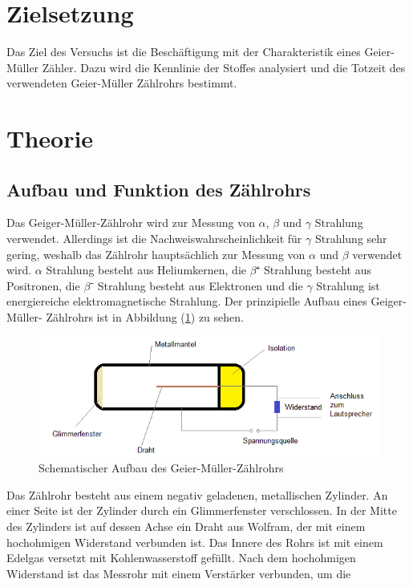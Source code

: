 \section{Zielsetzung}
\label{sec:Zielsetzung}
Das Ziel des Versuchs ist die Beschäftigung mit der Charakteristik eines Geier-Müller 
Zähler. Dazu wird die Kennlinie der Stoffes  analysiert und 
die Totzeit des verwendeten Geier-Müller Zählrohrs bestimmt.
\section{Theorie}
\label{sec:Theorie}
\subsection{Aufbau und Funktion des Zählrohrs}
Das Geiger-Müller-Zählrohr wird zur Messung von $\alpha$, $\beta$ 
und $\gamma$ Strahlung verwendet. Allerdings ist die 
Nachweiswahrscheinlichkeit für $\gamma$ Strahlung sehr gering, weshalb das Zählrohr
hauptsächlich zur Messung von $\alpha$ und $\beta$ verwendet wird. $\alpha$ 
Strahlung besteht aus Heliumkernen, die $\beta⁺$ Strahlung besteht aus Positronen, die
$\beta⁻$ Strahlung besteht aus Elektronen und die $\gamma$ Strahlung ist energiereiche elektromagnetische 
Strahlung. Der prinzipielle Aufbau eines Geiger-Müller-
Zählrohrs ist in Abbildung (\ref{fig:Aufbau}) zu sehen. 
\begin{figure}[H]
    \centering
    \includegraphics[width=\textwidth]{content/Bilder/Zaehlrohr_Aufbau.png}
    \caption{Schematischer Aufbau des Geier-Müller-Zählrohrs}
    \label{fig:Aufbau}
\end{figure}
Das Zählrohr besteht aus einem negativ geladenen, metallischen Zylinder. An einer Seite 
ist der Zylinder durch ein Glimmerfenster verschlossen. In der Mitte des Zylinders ist
auf dessen Achse ein Draht aus Wolfram, der mit einem hochohmigen Widerstand verbunden ist. 
Das Innere des Rohrs ist mit einem Edelgas versetzt mit Kohlenwasserstoff gefüllt. 
Nach dem hochohmigen Widerstand ist das Messrohr mit einem Verstärker verbunden, um die 
